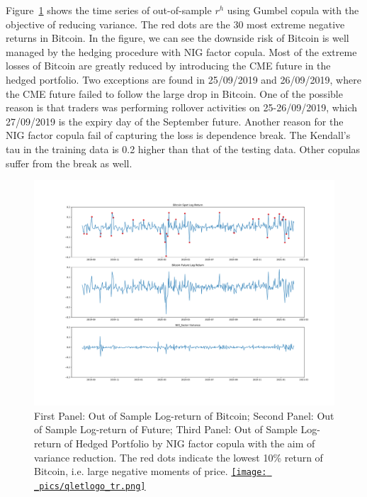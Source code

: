 Figure~\ref{fig:Gumbel} shows the time series of out-of-sample $r^h$ using Gumbel copula with the
objective of reducing variance.
The red dots are the 30 most extreme negative returns in Bitcoin.
In the figure, we can see the downside risk of Bitcoin is well managed by the hedging procedure with NIG factor copula.
Most of the extreme losses of Bitcoin are greatly reduced by introducing the CME future in the hedged portfolio.
Two exceptions are found in 25/09/2019 and 26/09/2019, where the CME future failed to follow the large drop in Bitcoin.
One of the possible reason is that traders was performing rollover activities on 25-26/09/2019, which
27/09/2019 is the expiry day of the September future.
Another reason for the NIG factor copula fail of capturing the loss is dependence break.
The Kendall's tau in the training data is 0.2 higher than that of the testing data.
Other copulas suffer from the break as well. \medskip
%
\begin{figure}[th]
   \centering
   \includegraphics[width=\textwidth]{_pics/OOSreturns_compare.pdf}
   \caption{First Panel: Out of Sample Log-return of Bitcoin; Second Panel: Out of Sample Log-return of Future;
   Third Panel: Out of Sample Log-return of Hedged Portfolio by NIG factor copula with the aim of variance reduction.
   The red dots indicate the lowest 10\% return of Bitcoin, i.e. large negative moments of price.
   \href{http://www.quantlet.com/}{\texttt{[image: \_pics/qletlogo\_tr.png]}}}
   \label{fig:Gumbel}
\end{figure}

